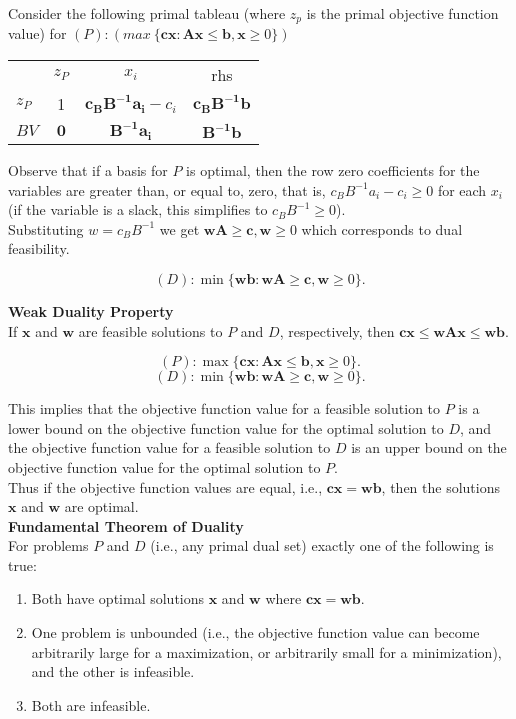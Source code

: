 \vspace{10mm} Consider the following primal tableau (where $z_p$ is the primal objective function value) for $(P): (max~\{\mathbf{cx}: \mathbf{Ax} \le \mathbf{b}, \mathbf{x} \ge 0\})$  

\begin{center} \begin{tabular} {l|c|c|c|} \cline{2-4}
		& $z_P$ 			& $x_i$	 						           & rhs \\ \cline{2-4}
$z_P$ 	& 1	   				& $\mathbf{c_BB^{-1}a_i}-c_i$ 	 	& $\mathbf{c_BB^{-1}b}$ \\
$BV$  	& $\mathbf{0}$ 	& $\mathbf{B^{-1}a_i}$   			& $\mathbf{B^{-1}b}$ \\\cline{2-4}
\end{tabular} \end{center} 

Observe that if a basis for $P$ is optimal, then the row zero coefficients for the variables are greater than, or equal to, zero, that is, $c_BB^{-1}a_i-c_i \ge 0$ for each $x_i$ (if the variable is a slack, this simplifies to $c_BB^{-1} \ge 0$). \\

Substituting $w=c_BB^{-1}$ we get $\mathbf{wA} \ge \mathbf{c}, \mathbf{w} \ge 0$ which corresponds to dual feasibility.

$$(D):\min \{\mathbf{wb}: \mathbf{wA} \ge \mathbf{c}, \mathbf{w} \ge 0\}.$$


{\bf Weak Duality Property} \\
If $\mathbf{x}$ and $\mathbf{w}$ are feasible solutions to $P$ and $D$, respectively, then $\mathbf{cx} \le \mathbf{wAx} \le \mathbf{wb}$.

$$(P):\max \{\mathbf{cx}: \mathbf{Ax} \le \mathbf{b}, \mathbf{x} \ge 0\}.$$ 
$$(D):\min \{\mathbf{wb}: \mathbf{wA} \ge \mathbf{c}, \mathbf{w} \ge 0\}.$$

This implies that the objective function value for a feasible solution to $P$ is a lower bound on the objective function value for the optimal solution to $D$, and the objective function value for a feasible solution to $D$ is an upper bound on the objective function value for the optimal solution to $P$. \\

Thus if the objective function values are equal, i.e., $\mathbf{cx} = \mathbf{wb}$, then the solutions $\mathbf{x}$ and $\mathbf{w}$ are optimal. \\

\vspace{6mm} {\bf Fundamental Theorem of Duality} \\
For problems $P$ and $D$ (i.e., any primal dual set) exactly one of the following is true:
\begin{enumerate}
\item Both have optimal solutions $\mathbf{x}$ and $\mathbf{w}$ where $\mathbf{cx} = \mathbf{wb}$.
\item One problem is unbounded (i.e., the objective function value can become arbitrarily large for a maximization,  or arbitrarily small for a minimization), and the other is infeasible.
\item Both are infeasible.
\end{enumerate}


